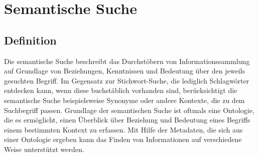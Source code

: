 \chapter{Semantische Suche}
\section{Definition}
Die semantische Suche beschreibt das Durchstöbern von Informationssammlung auf Grundlage von Beziehungen, Kenntnissen und Bedeutung über den jeweils gesuchten Begriff. Im Gegensatz zur Stichwort-Suche, die lediglich Schlagwörter entdecken kann, wenn diese buchstäblich vorhanden sind, berücksichtigt die semantische Suche beispielsweise Synonyme oder andere Kontexte, die zu dem Suchbegriff passen.\newline
Grundlage der semantischen Suche ist oftmals eine Ontologie, die es ermöglicht, einen Überblick über Beziehung und Bedeutung eines Begriffs einem bestimmten Kontext zu erfassen. Mit Hilfe der Metadaten, die sich aus einer Ontologie ergeben kann das Finden von Informationen auf verschiedene Weise unterstützt werden.
\cite{Sack.2010}\newline

